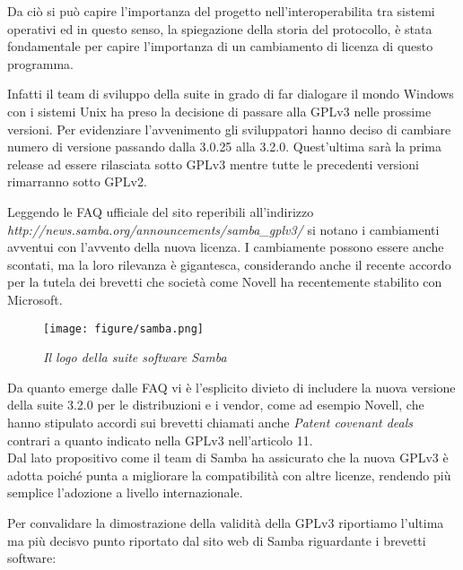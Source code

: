 Da ciò si può capire l'importanza del progetto nell'interoperabilita tra sistemi operativi ed in questo senso, la spiegazione della storia del protocollo, è stata fondamentale per capire l'importanza di un cambiamento di licenza di questo programma.

Infatti il team di sviluppo della suite in grado di far dialogare il mondo Windows con i sistemi Unix ha preso la decisione di passare alla GPLv3 nelle prossime versioni.
Per evidenziare l’avvenimento gli sviluppatori hanno deciso di cambiare numero di versione passando dalla 3.0.25 alla 3.2.0.
Quest’ultima sarà la prima release ad essere rilasciata sotto GPLv3 mentre tutte le precedenti versioni rimarranno sotto GPLv2.

Leggendo le FAQ ufficiale del sito reperibili all'indirizzo \\ \textit{http://news.samba.org/announcements/samba\_gplv3/} si notano i cambiamenti avventui con l'avvento della nuova licenza. I cambiamente possono essere anche scontati, ma la loro rilevanza è gigantesca, considerando anche il recente accordo per la tutela dei brevetti che società come Novell ha recentemente stabilito con Microsoft.


\begin{figure}[h]
	\begin{center}
		\texttt{[image: figure/samba.png]}
	\end{center}
	\caption{\textit{Il logo della suite software Samba}}
\end{figure}

Da quanto emerge dalle FAQ vi è l’esplicito divieto di includere la nuova versione della suite 3.2.0 per le distribuzioni e i vendor, come ad esempio Novell, che hanno stipulato accordi sui brevetti chiamati anche \textit{Patent covenant deals} contrari a quanto indicato nella GPLv3 nell'articolo 11.\\
Dal lato propositivo come il team di Samba ha assicurato che la nuova GPLv3 è adotta poiché punta a migliorare la compatibilità con altre licenze, rendendo più semplice l'adozione a livello internazionale.

\newpage

Per convalidare la dimostrazione della validità della GPLv3 riportiamo l'ultima ma più decisvo punto riportato dal sito web di Samba riguardante i brevetti software:\\





